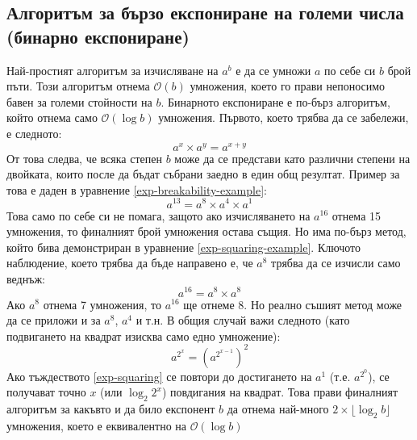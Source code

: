   \subsection{Алгоритъм за бързо експониране на големи числа (бинарно експониране)} \label{binexp}
  Най-простият алгоритъм за изчисляване на $a^b$ е да се умножи $a$ по себе си $b$ брой пъти. Този алгоритъм отнема $\mathcal{O}(b)$ умножения, което го прави непоносимо бавен за големи стойности на $b$. Бинарното експониране е по-бърз алгоритъм, който отнема само $\mathcal{O}(\log b)$ умножения.
  Първото, което трябва да се забележи, е следното:
  \begin{equation}
    a^x \times a^y = a^{x + y}
    \label{exp-breakability}
  \end{equation}
  От това следва, че всяка степен $b$ може да се представи като различни степени на двойката, които после да бъдат събрани заедно в един общ резултат. Пример за това е даден в уравнение \ref{exp-breakability-example}:
  \begin{equation}
    a^{13} = a^8 \times a^4 \times a^1
    \label{exp-breakability-example}
  \end{equation}
  Това само по себе си не помага, защото ако изчисляването на $a^{16}$ отнема 15 умножения, то финалният брой умножения остава същия. Но има по-бърз метод, който бива демонстриран в уравнение \ref{exp-squaring-example}. Ключото наблюдение, което трябва да бъде направено е, че $a^8$ трябва да се изчисли само веднъж:
  \begin{equation}
    a^{16} = a^8 \times a^8
    \label{exp-squaring-example}
  \end{equation}
  Ако $a^8$ отнема 7 умножения, то $a^{16}$ ще отнеме 8. Но реално съшият метод може да се приложи и за $a^8$, $a^4$ и т.н. В общия случай важи следното (като подвигането на квадрат изисква само едно умножение):
  \begin{equation}
    a^{2^x} = (a^{2^{x-1}})^2
    \label{exp-squaring}
  \end{equation}
  Ако тъждеството \ref{exp-squaring} се повтори до достигането на $a^1$ (т.е. $a^{2^0}$), се получават точно $x$ (или $\log_2 2^x$) повдигания на квадрат. Това прави финалният алгоритъм за какъвто и да било експонент $b$ да отнема най-много $2 \times \lfloor \log_2 b \rfloor$ умножения, което е еквивалентно на $\mathcal{O}(\log b)$

